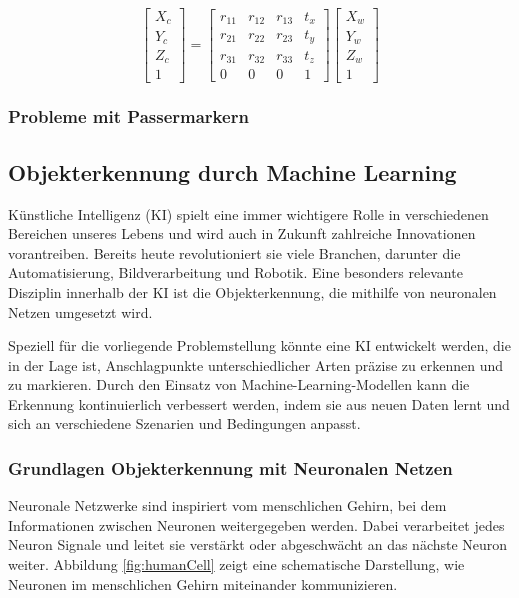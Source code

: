 \[
\begin{bmatrix}
X_c \\ 
Y_c \\ 
Z_c \\ 
1
\end{bmatrix}
=
\begin{bmatrix}
r_{11} & r_{12} & r_{13} & t_x \\
r_{21} & r_{22} & r_{23} & t_y \\
r_{31} & r_{32} & r_{33} & t_z \\
0 & 0 & 0 & 1
\end{bmatrix}
\begin{bmatrix}
X_w \\ 
Y_w \\ 
Z_w \\ 
1
\end{bmatrix}
\]

\subsubsection{Probleme mit Passermarkern}



\subsection{Objekterkennung durch Machine Learning}
Künstliche Intelligenz (KI) spielt eine immer wichtigere Rolle in verschiedenen Bereichen 
unseres Lebens und wird auch in Zukunft zahlreiche Innovationen vorantreiben. 
Bereits heute revolutioniert sie viele Branchen, darunter die Automatisierung, 
Bildverarbeitung und Robotik. Eine besonders relevante Disziplin innerhalb der KI ist die 
Objekterkennung, die mithilfe von neuronalen Netzen umgesetzt wird.

Speziell für die vorliegende Problemstellung könnte eine KI entwickelt werden, die in der 
Lage ist, Anschlagpunkte unterschiedlicher Arten präzise zu erkennen und zu markieren. 
Durch den Einsatz von Machine-Learning-Modellen kann die Erkennung kontinuierlich verbessert 
werden, indem sie aus neuen Daten lernt und sich an verschiedene Szenarien und Bedingungen 
anpasst.

\subsubsection{Grundlagen Objekterkennung mit Neuronalen Netzen}
Neuronale Netzwerke sind inspiriert vom menschlichen Gehirn, bei dem Informationen zwischen Neuronen weitergegeben 
werden. Dabei verarbeitet jedes Neuron Signale und leitet sie verstärkt oder abgeschwächt an das nächste Neuron weiter.
Abbildung \ref{fig:humanCell} zeigt eine schematische Darstellung, wie Neuronen im menschlichen Gehirn miteinander 
kommunizieren.

